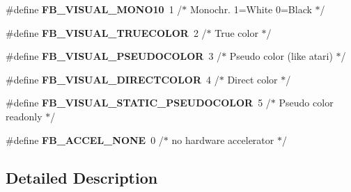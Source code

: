 \begin{DoxyCompactItemize}
\item 
\mbox{\label{group__libmisc__fb_ga55d13a80c93e0e286f6eb31c575b8eb3}} 
\#define {\bfseries F\+B\+\_\+\+V\+I\+S\+U\+A\+L\+\_\+\+M\+O\+N\+O10}~1    /$\ast$ Monochr. 1=White 0=Black $\ast$/
\item 
\mbox{\label{group__libmisc__fb_ga9f99be11f62bbbaa1b895ad193446bad}} 
\#define {\bfseries F\+B\+\_\+\+V\+I\+S\+U\+A\+L\+\_\+\+T\+R\+U\+E\+C\+O\+L\+OR}~2    /$\ast$ True color    $\ast$/
\item 
\mbox{\label{group__libmisc__fb_ga6b4dbf64f23fccef79bcf8455b58273c}} 
\#define {\bfseries F\+B\+\_\+\+V\+I\+S\+U\+A\+L\+\_\+\+P\+S\+E\+U\+D\+O\+C\+O\+L\+OR}~3    /$\ast$ Pseudo color (like atari) $\ast$/
\item 
\mbox{\label{group__libmisc__fb_gaf37117433243ceac4cb5ce74cbf8c8a8}} 
\#define {\bfseries F\+B\+\_\+\+V\+I\+S\+U\+A\+L\+\_\+\+D\+I\+R\+E\+C\+T\+C\+O\+L\+OR}~4    /$\ast$ Direct color $\ast$/
\item 
\mbox{\label{group__libmisc__fb_gae81126ffc325c005acf76990bcdee409}} 
\#define {\bfseries F\+B\+\_\+\+V\+I\+S\+U\+A\+L\+\_\+\+S\+T\+A\+T\+I\+C\+\_\+\+P\+S\+E\+U\+D\+O\+C\+O\+L\+OR}~5    /$\ast$ Pseudo color readonly $\ast$/
\item 
\mbox{\label{group__libmisc__fb_ga7b059f07efe88e7eb104a700326d4b8d}} 
\#define {\bfseries F\+B\+\_\+\+A\+C\+C\+E\+L\+\_\+\+N\+O\+NE}~0    /$\ast$ no hardware accelerator    $\ast$/
\end{DoxyCompactItemize}


\subsection{Detailed Description}
